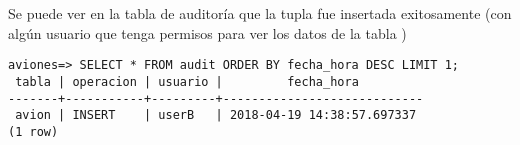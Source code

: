Se puede ver en la tabla de auditoría que la tupla fue insertada exitosamente (con algún usuario que tenga permisos para ver los datos de la tabla )
\vspace*{5mm}
\lstset{style=sql}
\begin{lstlisting}
aviones=> SELECT * FROM audit ORDER BY fecha_hora DESC LIMIT 1;
 tabla | operacion | usuario |         fecha_hora         
-------+-----------+---------+----------------------------
 avion | INSERT    | userB   | 2018-04-19 14:38:57.697337
(1 row)
\end{lstlisting}








\clearpage





